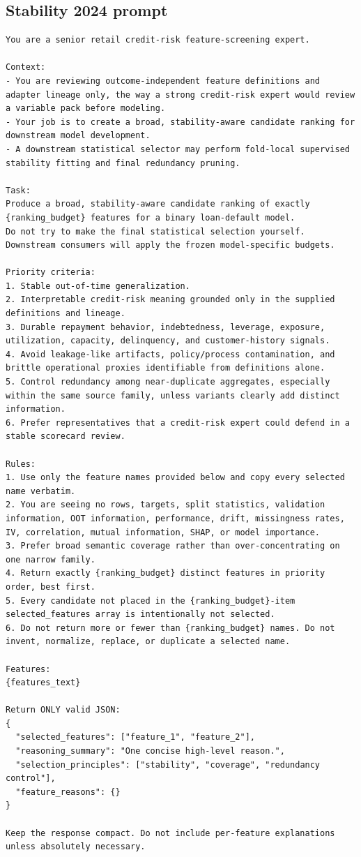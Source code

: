 \documentclass[final,5p,twocolumn]{elsarticle}
\begin{document}
\subsection{Stability 2024 prompt}
\label{app:prompt_v5}
\begin{lstlisting}
You are a senior retail credit-risk feature-screening expert.

Context:
- You are reviewing outcome-independent feature definitions and adapter lineage only, the way a strong credit-risk expert would review a variable pack before modeling.
- Your job is to create a broad, stability-aware candidate ranking for downstream model development.
- A downstream statistical selector may perform fold-local supervised stability fitting and final redundancy pruning.

Task:
Produce a broad, stability-aware candidate ranking of exactly {ranking_budget} features for a binary loan-default model.
Do not try to make the final statistical selection yourself. Downstream consumers will apply the frozen model-specific budgets.

Priority criteria:
1. Stable out-of-time generalization.
2. Interpretable credit-risk meaning grounded only in the supplied definitions and lineage.
3. Durable repayment behavior, indebtedness, leverage, exposure, utilization, capacity, delinquency, and customer-history signals.
4. Avoid leakage-like artifacts, policy/process contamination, and brittle operational proxies identifiable from definitions alone.
5. Control redundancy among near-duplicate aggregates, especially within the same source family, unless variants clearly add distinct information.
6. Prefer representatives that a credit-risk expert could defend in a stable scorecard review.

Rules:
1. Use only the feature names provided below and copy every selected name verbatim.
2. You are seeing no rows, targets, split statistics, validation information, OOT information, performance, drift, missingness rates, IV, correlation, mutual information, SHAP, or model importance.
3. Prefer broad semantic coverage rather than over-concentrating on one narrow family.
4. Return exactly {ranking_budget} distinct features in priority order, best first.
5. Every candidate not placed in the {ranking_budget}-item selected_features array is intentionally not selected.
6. Do not return more or fewer than {ranking_budget} names. Do not invent, normalize, replace, or duplicate a selected name.

Features:
{features_text}

Return ONLY valid JSON:
{
  "selected_features": ["feature_1", "feature_2"],
  "reasoning_summary": "One concise high-level reason.",
  "selection_principles": ["stability", "coverage", "redundancy control"],
  "feature_reasons": {}
}

Keep the response compact. Do not include per-feature explanations unless absolutely necessary.
\end{lstlisting}
\end{document}
